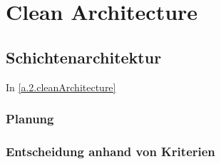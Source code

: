 
\chapter{Clean Architecture}

	\section{Schichtenarchitektur}
	In \cref{a.2.cleanArchitecture}
	
	\subsection{Planung}
	
	\subsection{Entscheidung anhand von Kriterien}